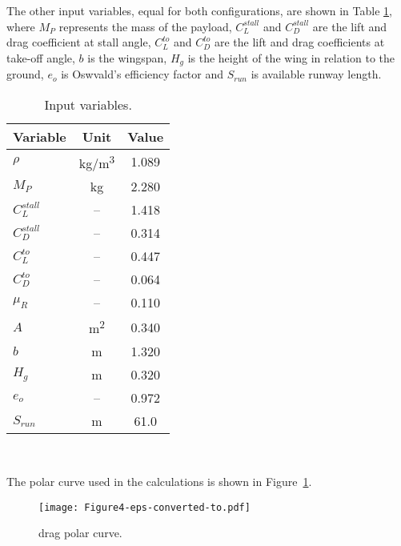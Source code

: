 \documentclass[10pt]{SelfArx} %
\begin{document}
The other input variables, equal for both configurations, are shown in Table \ref{Tab:input_variables}, where $M_P$ represents the mass of the payload, $C_ {L}^{stall}$ and $C_ {D}^{stall}$ are  the lift and drag coefficient at stall angle, $C_ {L}^{to}$ and $C_ {D}^{to}$ are the lift and drag coefficients at take-off angle, $b$ is the wingspan, $H_{g}$ is the height of the wing in relation to the ground,  $e_o$ is Oswvald's efficiency factor and $S_ {run}$ is available runway length.
\begin{table}[htb]
\small\sf\centering
\caption{Input variables.\label{Tab:input_variables}}
\begin{tabular}{lcc}
\toprule
Variable				&Unit		 				&Value	\\
\midrule
$\rho$   				&kg/m\textsuperscript{3}			& 1.089	\\
$M_P$                 			&kg						& 2.280	\\
$C_ {L}^{stall}$			&-- 						& 1.418	\\
$C_ {D}^{stall}$       		&--						&  0.314	\\
$C_ {L}^{to}$          		&--						& 0.447	\\
$C_ {D}^{to}$         		&--						& 0.064	\\
$\mu_R$                  		&--						& 0.110	\\
$A$           				&m\textsuperscript{2} 			& 0.340	\\
$b$ 	                   			&m 						& 1.320	\\
$H_{g}$              			&m 						& 0.320	\\
$e_o$                       		&--						& 0.972	\\
$S_{run}$                 		&m 						& 61.0		\\
\bottomrule
\end{tabular}\\[16pt]
\end{table}

The polar curve used in the calculations is shown in Figure~\ref{Fig:polar}.
\begin{figure}[htb]
	\begin{center}
		\texttt{[image: Figure4-eps-converted-to.pdf]}
		\caption{drag polar curve.}
		\label{Fig:polar}
	\end{center}
\end{figure}
\end{document}
